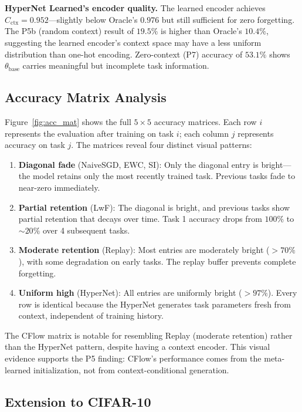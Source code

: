 \documentclass{article}
\begin{document}
\textbf{HyperNet Learned's encoder quality.} The learned encoder achieves $\hat{C}_\mathrm{ctx} = 0.952$---slightly below Oracle's $0.976$ but still sufficient for zero forgetting. The P5b (random context) result of $19.5\%$ is higher than Oracle's $10.4\%$, suggesting the learned encoder's context space may have a less uniform distribution than one-hot encoding. Zero-context (P7) accuracy of $53.1\%$ shows $\theta_\mathrm{base}$ carries meaningful but incomplete task information.

\subsection{Accuracy Matrix Analysis}

Figure~\ref{fig:acc_mat} shows the full $5 \times 5$ accuracy matrices. Each row $i$ represents the evaluation after training on task $i$; each column $j$ represents accuracy on task $j$. The matrices reveal four distinct visual patterns:

\begin{enumerate}
    \item \textbf{Diagonal fade} (NaiveSGD, EWC, SI): Only the diagonal entry is bright---the model retains only the most recently trained task. Previous tasks fade to near-zero immediately.
    \item \textbf{Partial retention} (LwF): The diagonal is bright, and previous tasks show partial retention that decays over time. Task 1 accuracy drops from $100\%$ to $\sim 20\%$ over 4 subsequent tasks.
    \item \textbf{Moderate retention} (Replay): Most entries are moderately bright ($> 70\%$), with some degradation on early tasks. The replay buffer prevents complete forgetting.
    \item \textbf{Uniform high} (HyperNet): All entries are uniformly bright ($> 97\%$). Every row is identical because the HyperNet generates task parameters fresh from context, independent of training history.
\end{enumerate}

The CFlow matrix is notable for resembling Replay (moderate retention) rather than the HyperNet pattern, despite having a context encoder. This visual evidence supports the P5 finding: CFlow's performance comes from the meta-learned initialization, not from context-conditional generation.

\subsection{Extension to CIFAR-10}
\label{sec:cifar10}
\end{document}
